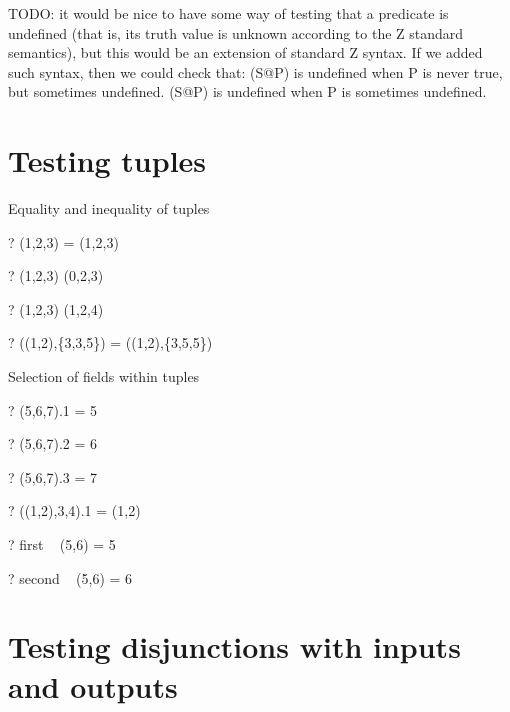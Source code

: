 \documentclass{article}
\begin{document}
TODO: it would be nice to have some way of testing that a predicate is 
      undefined (that is, its truth value is unknown according to the Z 
      standard semantics), but this would be an extension of standard Z syntax.
      If we added such syntax, then we could check that:
      (\exists S@P) is undefined when P is never true, but sometimes undefined.
      (\forall S@P) is undefined when P is sometimes undefined.


\section{Testing tuples}

Equality and inequality of tuples
\begin{zed} \vdash? (1,2,3) = (1,2,3) \end{zed}
\begin{zed} \vdash? (1,2,3) \neq (0,2,3) \end{zed}
\begin{zed} \vdash? (1,2,3) \neq (1,2,4) \end{zed}
\begin{zed} \vdash? ((1,2),\{3,3,5\}) = ((1,2),\{3,5,5\}) \end{zed}

Selection of fields within tuples
\begin{zed} \vdash? (5,6,7).1 = 5 \end{zed}
\begin{zed} \vdash? (5,6,7).2 = 6 \end{zed}
\begin{zed} \vdash? (5,6,7).3 = 7 \end{zed}
\begin{zed} \vdash? ((1,2),3,4).1 = (1,2) \end{zed}
\begin{zed} \vdash? first ~ (5,6) = 5 \end{zed}
\begin{zed} \vdash? second ~ (5,6) = 6 \end{zed}


\section{Testing disjunctions with inputs and outputs}
\end{document}
